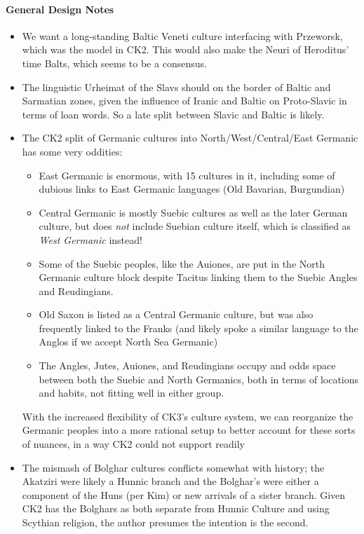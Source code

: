 \documentclass{article}
\begin{document}
	\paragraph{General Design Notes}
	\begin{itemize}
		\item We want a long-standing Baltic Veneti culture interfacing with Przeworsk, which was the model in CK2. This would also make the Neuri of Heroditus’ time Balts, which seems to be a consensus.
		\item The linguistic Urheimat of the Slavs should on the border of Baltic and Sarmatian zones, given the influence of Iranic and Baltic on Proto-Slavic in terms of loan words.
		So a late split between Slavic and Baltic is likely.
		\item The CK2 split of Germanic cultures into North/West/Central/East Germanic has some very oddities:
		\begin{itemize}
			\item East Germanic is enormous, with 15 cultures in it, including some of dubious links to East Germanic languages (Old Bavarian, Burgundian)
			\item Central Germanic is mostly Suebic cultures as well as the later German culture, but does \textit{not} include Suebian culture itself, which is classified as \textit{West Germanic} instead!
			\item Some of the Suebic peoples, like the Auiones, are put in the North Germanic culture block despite Tacitus linking them to the Suebic Angles and Reudingians.
			\item Old Saxon is listed as a Central Germanic culture, but was also frequently linked to the Franks (and likely spoke a similar language to the Anglos if we accept North Sea Germanic)
			\item The Angles, Jutes, Auiones, and Reudingians occupy and odds space between both the Suebic and North Germanics, both in terms of locations and habits, not fitting well in either group.
		\end{itemize}
		With the increased flexibility of CK3's culture system, we can reorganize the Germanic peoples into a more rational setup to better account for these sorts of nuances, in a way CK2 could not support readily
		\item The mismash of Bolghar cultures conflicts somewhat with history; the Akatziri were likely a Hunnic branch \cite{KimHuns,OttoHuns} and the Bolghar's were either a component of the Huns (per Kim) or new arrivals of a sister branch.
		Given CK2 has the Bolghars as both separate from Hunnic Culture and using Scythian religion, the author presumes the intention is the second.
	\end{itemize}
	
\end{document}
